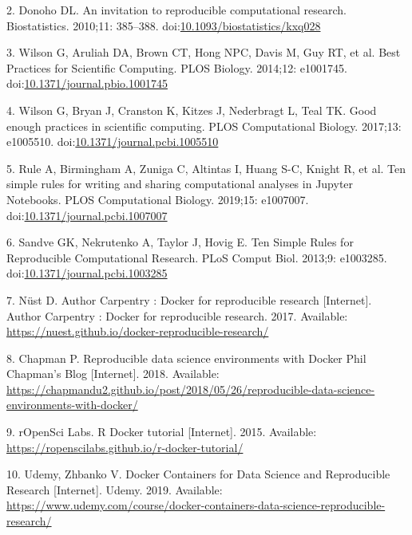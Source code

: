 \documentclass[10pt,letterpaper]{article}
\begin{document}
\leavevmode\hypertarget{ref-donoho_invitation_2010}{}%
2. Donoho DL. An invitation to reproducible computational research.
Biostatistics. 2010;11: 385--388.
doi:\href{https://doi.org/10.1093/biostatistics/kxq028}{10.1093/biostatistics/kxq028}

\leavevmode\hypertarget{ref-wilson_best_2014}{}%
3. Wilson G, Aruliah DA, Brown CT, Hong NPC, Davis M, Guy RT, et al.
Best Practices for Scientific Computing. PLOS Biology. 2014;12:
e1001745.
doi:\href{https://doi.org/10.1371/journal.pbio.1001745}{10.1371/journal.pbio.1001745}

\leavevmode\hypertarget{ref-wilson_good_2017}{}%
4. Wilson G, Bryan J, Cranston K, Kitzes J, Nederbragt L, Teal TK. Good
enough practices in scientific computing. PLOS Computational Biology.
2017;13: e1005510.
doi:\href{https://doi.org/10.1371/journal.pcbi.1005510}{10.1371/journal.pcbi.1005510}

\leavevmode\hypertarget{ref-rule_ten_2019}{}%
5. Rule A, Birmingham A, Zuniga C, Altintas I, Huang S-C, Knight R, et
al. Ten simple rules for writing and sharing computational analyses in
Jupyter Notebooks. PLOS Computational Biology. 2019;15: e1007007.
doi:\href{https://doi.org/10.1371/journal.pcbi.1007007}{10.1371/journal.pcbi.1007007}

\leavevmode\hypertarget{ref-sandve_ten_2013}{}%
6. Sandve GK, Nekrutenko A, Taylor J, Hovig E. Ten Simple Rules for
Reproducible Computational Research. PLoS Comput Biol. 2013;9: e1003285.
doi:\href{https://doi.org/10.1371/journal.pcbi.1003285}{10.1371/journal.pcbi.1003285}

\leavevmode\hypertarget{ref-nust_author_2017}{}%
7. Nüst D. Author Carpentry : Docker for reproducible research
{[}Internet{]}. Author Carpentry : Docker for reproducible research.
2017. Available:
\url{https://nuest.github.io/docker-reproducible-research/}

\leavevmode\hypertarget{ref-chapman_reproducible_2018}{}%
8. Chapman P. Reproducible data science environments with Docker Phil
Chapman's Blog {[}Internet{]}. 2018. Available:
\url{https://chapmandu2.github.io/post/2018/05/26/reproducible-data-science-environments-with-docker/}

\leavevmode\hypertarget{ref-ropensci_labs_r_2015}{}%
9. rOpenSci Labs. R Docker tutorial {[}Internet{]}. 2015. Available:
\url{https://ropenscilabs.github.io/r-docker-tutorial/}

\leavevmode\hypertarget{ref-udemy_docker_2019}{}%
10. Udemy, Zhbanko V. Docker Containers for Data Science and
Reproducible Research {[}Internet{]}. Udemy. 2019. Available:
\url{https://www.udemy.com/course/docker-containers-data-science-reproducible-research/}
\end{document}
